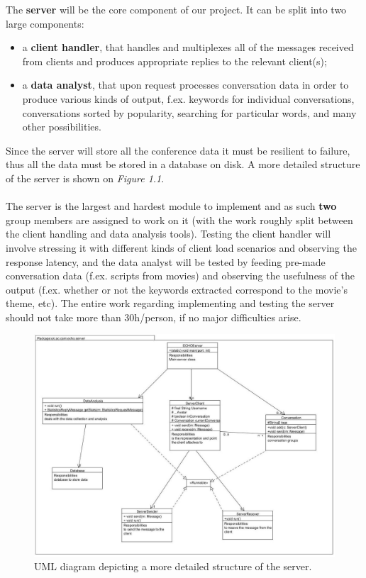 \documentclass[12p, a4paper, onecolumn]{report}
\begin{document}
The \textbf{server} will be the core component of our project. It can be split into two large components: 
\begin{itemize}
\item a \textbf{client handler}, that handles and multiplexes all of the messages received from clients and produces appropriate replies to the relevant client(s);
\item a \textbf{data analyst}, that upon request processes conversation data in order to produce various kinds of output, f.ex. keywords for individual conversations, conversations sorted by popularity, searching for particular words, and many other possibilities. 
\end{itemize}
Since the server will store all the conference data it must be resilient to failure, thus all the data must be stored in a database on disk. A more detailed structure of the server is shown on \emph{Figure 1.1}. \\ \\
The server is the largest and hardest module to implement and as such \textbf{two} group members are assigned to work on it (with the work roughly split between the client handling and data analysis tools). Testing the client handler will involve stressing it with different kinds of client load scenarios and observing the response latency, and the data analyst will be tested by feeding pre-made conversation data (f.ex. scripts from movies) and observing the usefulness of the output (f.ex. whether or not the keywords extracted correspond to the movie’s theme, etc).
The entire work regarding implementing and testing the server should not take more than 30h/person, if no major difficulties arise.
\begin{figure}[H]
  \centering
  \includegraphics[width=\textwidth]{UMLServer.jpg}
  \caption{UML diagram depicting a more detailed structure of the server.}
\end{figure}
\end{document}
